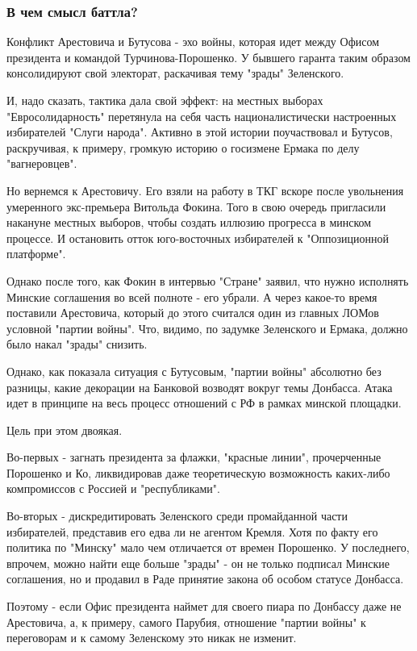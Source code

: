  
 
 

\subsubsection{В чем смысл баттла?}

Конфликт Арестовича и Бутусова - эхо войны, которая идет между Офисом
президента и командой Турчинова-Порошенко. У бывшего гаранта таким образом
консолидируют свой электорат, раскачивая тему "зрады" Зеленского.

И, надо сказать, тактика дала свой эффект: на местных выборах
"Евросолидарность" перетянула на себя часть националистически настроенных
избирателей "Слуги народа". Активно в этой истории поучаствовал и Бутусов,
раскручивая, к примеру, громкую историю о госизмене Ермака по делу
"вагнеровцев". 

Но вернемся к Арестовичу. Его взяли на работу в ТКГ вскоре после
увольнения умеренного экс-премьера Витольда Фокина. Того в свою очередь
пригласили накануне местных выборов, чтобы создать иллюзию прогресса в
минском процессе. И остановить отток юго-восточных избирателей к
"Оппозиционной платформе". 

Однако после того, как Фокин в интервью "Стране"
заявил,
что нужно исполнять Минские соглашения во всей полноте - его убрали. А через
какое-то время поставили Арестовича, который до этого считался один из главных
ЛОМов условной "партии войны". Что, видимо, по задумке Зеленского и Ермака,
должно было накал "зрады" снизить. 

Однако, как показала ситуация с Бутусовым, "партии войны" абсолютно без
разницы, какие декорации на Банковой возводят вокруг темы Донбасса. Атака
идет в принципе на весь процесс отношений с РФ в рамках минской площадки.

Цель при этом двоякая.

Во-первых - загнать президента за флажки, "красные линии", прочерченные
Порошенко и Ко, ликвидировав даже теоретическую возможность каких-либо
компромиссов с Россией и "республиками". 

Во-вторых - дискредитировать Зеленского среди промайданной части
избирателей, представив его едва ли не агентом Кремля. Хотя по факту его
политика по "Минску" мало чем отличается от времен Порошенко. У
последнего, впрочем, можно найти еще больше "зрады" - он не только
подписал Минские соглашения, но и продавил в Раде принятие закона об
особом статусе Донбасса. 

Поэтому - если Офис президента наймет для своего пиара по Донбассу даже не
Арестовича, а, к примеру, самого Парубия, отношение "партии войны" к
переговорам и к самому Зеленскому это никак не изменит.
